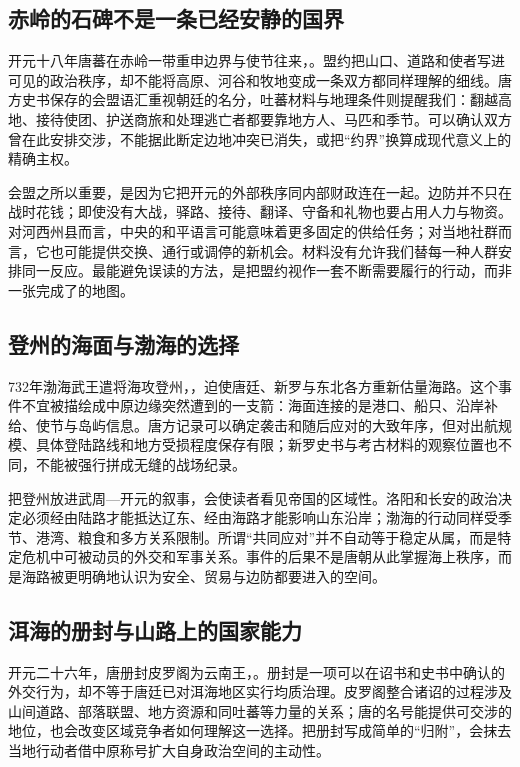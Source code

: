 \subsection{赤岭的石碑不是一条已经安静的国界}
开元十八年唐蕃在赤岭一带重申边界与使节往来，。盟约把山口、道路和使者写进可见的政治秩序，却不能将高原、河谷和牧地变成一条双方都同样理解的细线。唐方史书保存的会盟语汇重视朝廷的名分，吐蕃材料与地理条件则提醒我们：翻越高地、接待使团、护送商旅和处理逃亡者都要靠地方人、马匹和季节。可以确认双方曾在此安排交涉，不能据此断定边地冲突已消失，或把“约界”换算成现代意义上的精确主权。

会盟之所以重要，是因为它把开元的外部秩序同内部财政连在一起。边防并不只在战时花钱；即使没有大战，驿路、接待、翻译、守备和礼物也要占用人力与物资。对河西州县而言，中央的和平语言可能意味着更多固定的供给任务；对当地社群而言，它也可能提供交换、通行或调停的新机会。材料没有允许我们替每一种人群安排同一反应。最能避免误读的方法，是把盟约视作一套不断需要履行的行动，而非一张完成了的地图。

\subsection{登州的海面与渤海的选择}
732年渤海武王遣将海攻登州，，迫使唐廷、新罗与东北各方重新估量海路。这个事件不宜被描绘成中原边缘突然遭到的一支箭：海面连接的是港口、船只、沿岸补给、使节与岛屿信息。唐方记录可以确定袭击和随后应对的大致年序，但对出航规模、具体登陆路线和地方受损程度保存有限；新罗史书与考古材料的观察位置也不同，不能被强行拼成无缝的战场纪录。

把登州放进武周—开元的叙事，会使读者看见帝国的区域性。洛阳和长安的政治决定必须经由陆路才能抵达辽东、经由海路才能影响山东沿岸；渤海的行动同样受季节、港湾、粮食和多方关系限制。所谓“共同应对”并不自动等于稳定从属，而是特定危机中可被动员的外交和军事关系。事件的后果不是唐朝从此掌握海上秩序，而是海路被更明确地认识为安全、贸易与边防都要进入的空间。

\subsection{洱海的册封与山路上的国家能力}
开元二十六年，唐册封皮罗阁为云南王，。册封是一项可以在诏书和史书中确认的外交行为，却不等于唐廷已对洱海地区实行均质治理。皮罗阁整合诸诏的过程涉及山间道路、部落联盟、地方资源和同吐蕃等力量的关系；唐的名号能提供可交涉的地位，也会改变区域竞争者如何理解这一选择。把册封写成简单的“归附”，会抹去当地行动者借中原称号扩大自身政治空间的主动性。

